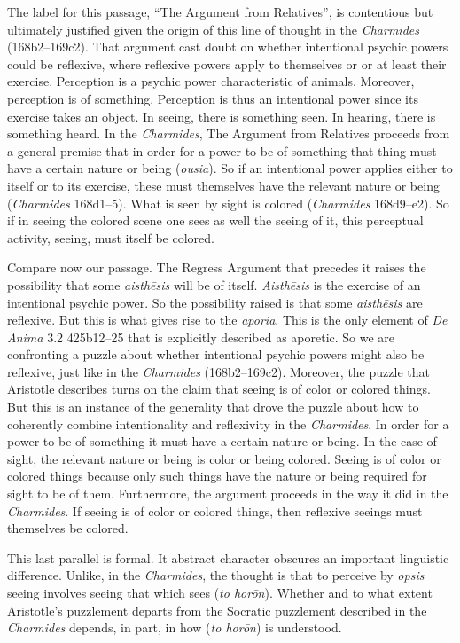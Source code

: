 The label for this passage, ``The Argument from Relatives'', is contentious but ultimately justified given the origin of this line of thought in the \emph{Charmides} (168b2–169c2). That argument cast doubt on whether intentional psychic powers could be reflexive, where reflexive powers apply to themselves or or at least their exercise. Perception is a psychic power characteristic of animals. Moreover, perception is of something. Perception is thus an intentional power since its exercise takes an object. In seeing, there is something seen. In hearing, there is something heard. In the \emph{Charmides}, The Argument from Relatives proceeds from a general premise that in order for a power to be of something that thing must have a certain nature or being (\emph{ousia}). So if an intentional power applies either to itself or to its exercise, these must themselves have the relevant nature or being (\emph{Charmides} 168d1–5). What is seen by sight is colored (\emph{Charmides} 168d9–e2). So if in seeing the colored scene one sees as well the seeing of it, this perceptual activity, seeing, must itself be colored.

Compare now our passage. The Regress Argument that precedes it raises the possibility that some \emph{aisthēsis} will be of itself. \emph{Aisthēsis} is the exercise of an intentional psychic power. So the possibility raised is that some \emph{aisthēsis} are reflexive. But this is what gives rise to the \emph{aporia}. This is the only element of \emph{De Anima} 3.2 425b12–25 that is explicitly described as aporetic. So we are confronting a puzzle about whether intentional psychic powers might also be reflexive, just like in the \emph{Charmides} (168b2–169c2). Moreover, the puzzle that Aristotle describes turns on the claim that seeing is of color or colored things. But this is an instance of the generality that drove the puzzle about how to coherently combine intentionality and reflexivity in the \emph{Charmides}. In order for a power to be of something it must have a certain nature or being. In the case of sight, the relevant nature or being is color or being colored. Seeing is of color or colored things because only such things have the nature or being required for sight to be of them. Furthermore, the argument proceeds in the way it did in the \emph{Charmides}. If seeing is of color or colored things, then reflexive seeings must themselves be colored.

This last parallel is formal. It abstract character obscures an important linguistic difference. Unlike, in the \emph{Charmides}, the thought is that to perceive by \emph{opsis} seeing involves seeing that which sees (\emph{to horōn}). Whether and to what extent Aristotle's puzzlement departs from the Socratic puzzlement described in the \emph{Charmides} depends, in part, in how (\emph{to horōn}) is understood.

